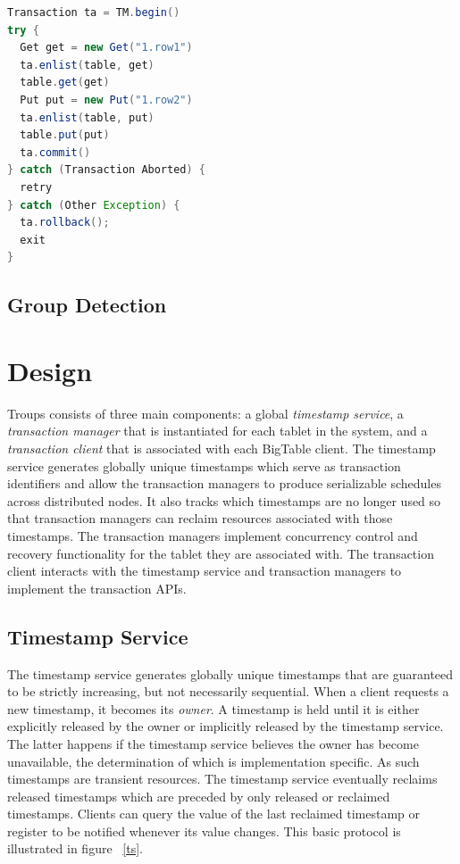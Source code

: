\documentclass[10pt,final,journal]{IEEEtran}
\begin{document}
\begin{lstlisting}[language=Java,caption=Group Transaction Syntax,float,label=tran,emph={begin,enlist,commit,rollback},emphstyle=\underbar]
Transaction ta = TM.begin()
try {
  Get get = new Get("1.row1")
  ta.enlist(table, get)
  table.get(get)
  Put put = new Put("1.row2")
  ta.enlist(table, put)
  table.put(put)
  ta.commit()
} catch (Transaction Aborted) {
  retry
} catch (Other Exception) {
  ta.rollback();
  exit
}
\end{lstlisting}

\subsection{Group Detection}

\section{Design}
Troups consists of three main components: a global \emph{timestamp service}, a \emph{transaction manager} that is instantiated for each tablet in the system, and a \emph{transaction client} that is associated with each BigTable client. The timestamp service generates globally unique timestamps which serve as transaction identifiers and allow the transaction managers to produce serializable schedules across distributed nodes. It also tracks which timestamps are no longer used so that transaction managers can reclaim resources associated with those timestamps. The transaction managers implement concurrency control and recovery functionality for the tablet they are associated with. The transaction client interacts with the timestamp service and transaction managers to implement the transaction APIs.

\subsection{Timestamp Service}
The timestamp service generates globally unique timestamps that are guaranteed to be strictly increasing, but not necessarily sequential. When a client requests a new timestamp, it becomes its \emph{owner}. A timestamp is held until it is either explicitly released by the owner or implicitly released by the timestamp service. The latter happens if the timestamp service believes the owner has become unavailable, the determination of which is implementation specific. As such timestamps are transient resources. The timestamp service eventually reclaims released timestamps which are preceded by only released or reclaimed timestamps. Clients can query the value of the last reclaimed timestamp or register to be notified whenever its value changes. This basic protocol is illustrated in figure ~\ref{ts}. 
\end{document}
